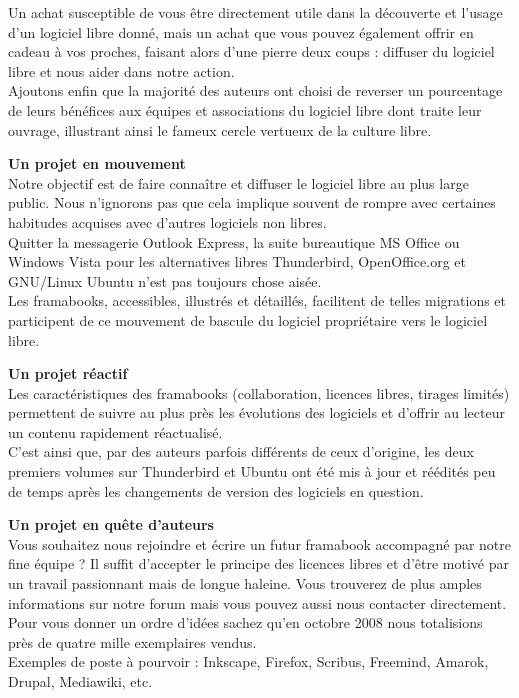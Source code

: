 {Un achat susceptible de vous être directement utile dans la découverte et l'usage d'un logiciel libre donné, mais un achat que vous pouvez également offrir en cadeau à vos proches, faisant alors d'une pierre deux coups : diffuser du logiciel libre et nous aider dans notre action.\\
Ajoutons enfin que la majorité des auteurs ont choisi de reverser un pourcentage de leurs bénéfices aux équipes et associations du logiciel libre dont traite leur ouvrage, illustrant ainsi le fameux cercle vertueux de la culture libre.\par
\textbf{Un projet en mouvement}\\
Notre objectif est de faire connaître et diffuser le logiciel libre au plus large public. Nous n'ignorons pas que cela implique souvent de rompre avec certaines habitudes acquises avec d'autres logiciels non libres.\\
Quitter la messagerie Outlook Express, la suite bureautique MS Office ou Windows Vista pour les alternatives libres Thunderbird, OpenOffice.org et GNU/Linux Ubuntu n'est pas toujours chose aisée.\\
Les framabooks, accessibles, illustrés et détaillés, facilitent de telles migrations et participent de ce mouvement de bascule du logiciel propriétaire vers le logiciel libre.\par
\newpage
\textbf{Un projet réactif}\\
Les caractéristiques des framabooks (collaboration, licences libres, tirages limités) permettent de suivre au plus près les évolutions des logiciels et d'offrir au lecteur un contenu rapidement réactualisé.\\
C'est ainsi que, par des auteurs parfois différents de ceux d'origine, les deux premiers volumes sur Thunderbird et Ubuntu ont été mis à jour et réédités peu de temps après les changements de version des logiciels en question.\par
\textbf{Un projet en quête d'auteurs}\\
Vous souhaitez nous rejoindre et écrire un futur framabook accompagné par notre fine équipe ? Il suffit d'accepter le principe des licences libres et d'être motivé par un travail passionnant mais de longue haleine. Vous trouverez de plus amples informations sur notre forum mais vous pouvez aussi nous contacter directement.\\
Pour vous donner un ordre d'idées sachez qu'en octobre 2008 nous totalisions près de quatre mille exemplaires vendus.\\
Exemples de poste à pourvoir : Inkscape, Firefox, Scribus, Freemind, Amarok, Drupal, Mediawiki, etc.\par
}
